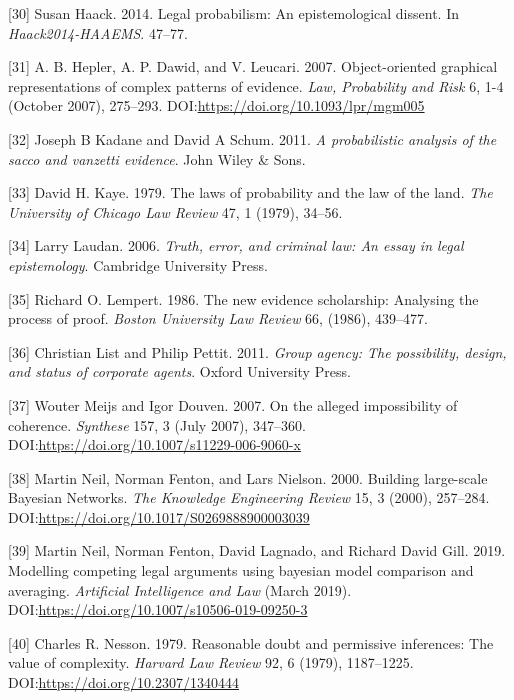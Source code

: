 \documentclass[11pt,dvipsnames,enabledeprecatedfontcommands]{scrartcl}
\begin{document}
\hypertarget{ref-haack2011legal}{}
{[}30{]} Susan Haack. 2014. Legal probabilism: An epistemological
dissent. In \emph{Haack2014-HAAEMS}. 47--77.

\hypertarget{ref-hepler2007ObjectorientedGraphicalRepresentations}{}
{[}31{]} A. B. Hepler, A. P. Dawid, and V. Leucari. 2007.
Object-oriented graphical representations of complex patterns of
evidence. \emph{Law, Probability and Risk} 6, 1-4 (October 2007),
275--293. DOI:\url{https://doi.org/10.1093/lpr/mgm005}

\hypertarget{ref-kadane2011probabilistic}{}
{[}32{]} Joseph B Kadane and David A Schum. 2011. \emph{A probabilistic
analysis of the sacco and vanzetti evidence}. John Wiley \& Sons.

\hypertarget{ref-kaye79}{}
{[}33{]} David H. Kaye. 1979. The laws of probability and the law of the
land. \emph{The University of Chicago Law Review} 47, 1 (1979), 34--56.

\hypertarget{ref-laudan2006truth}{}
{[}34{]} Larry Laudan. 2006. \emph{Truth, error, and criminal law: An
essay in legal epistemology}. Cambridge University Press.

\hypertarget{ref-Lempert1986}{}
{[}35{]} Richard O. Lempert. 1986. The new evidence scholarship:
Analysing the process of proof. \emph{Boston University Law Review} 66,
(1986), 439--477.

\hypertarget{ref-List2011Group}{}
{[}36{]} Christian List and Philip Pettit. 2011. \emph{Group agency: The
possibility, design, and status of corporate agents}. Oxford University
Press.

\hypertarget{ref-meijs2007}{}
{[}37{]} Wouter Meijs and Igor Douven. 2007. On the alleged
impossibility of coherence. \emph{Synthese} 157, 3 (July 2007),
347--360. DOI:\url{https://doi.org/10.1007/s11229-006-9060-x}

\hypertarget{ref-neil2000BuildingLargescaleBayesian}{}
{[}38{]} Martin Neil, Norman Fenton, and Lars Nielson. 2000. Building
large-scale Bayesian Networks. \emph{The Knowledge Engineering Review}
15, 3 (2000), 257--284.
DOI:\url{https://doi.org/10.1017/S0269888900003039}

\hypertarget{ref-Fenton2019Modelling}{}
{[}39{]} Martin Neil, Norman Fenton, David Lagnado, and Richard David
Gill. 2019. Modelling competing legal arguments using bayesian model
comparison and averaging. \emph{Artificial Intelligence and Law} (March
2019). DOI:\url{https://doi.org/10.1007/s10506-019-09250-3}

\hypertarget{ref-Nesson1979Reasonable-doub}{}
{[}40{]} Charles R. Nesson. 1979. Reasonable doubt and permissive
inferences: The value of complexity. \emph{Harvard Law Review} 92, 6
(1979), 1187--1225. DOI:\url{https://doi.org/10.2307/1340444}
\end{document}
